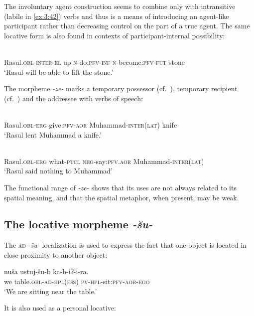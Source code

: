 ﻿\documentclass[output=paper]{langsci/langscibook}
\begin{document}
The involuntary agent construction seems to combine only with
intransitive (labile in \ref{ex:3:42}) verbs and thus is a means of introducing an
agent-like participant rather than decreasing control on the part of a
true agent. The same locative form is also found in contexts of
participant-internal possibility:

\ea
{}\\
Rasul.\textsc{obl}-\textsc{inter}-\textsc{el} up \textsc{n}-do:\textsc{pfv}-\textsc{inf} \textsc{n}-become:\textsc{pfv}-\textsc{fut} stone\\
\glt `Rasul will be able to lift the stone.'
\z

The morpheme \emph{-ze-} marks a temporary possessor (cf.\ ),
temporary recipient (cf.\ ) and the addressee with verbs of speech:

\ea
{}\\
Rasul.\textsc{obl}-\textsc{erg} give:\textsc{pfv}-\textsc{aor} Muhammad-\textsc{inter}(\textsc{lat}) knife\\
\glt `Rasul lent Muhammad a knife.'

\ex
{}\\
Rasul.\textsc{obl}-\textsc{erg} what-\textsc{ptcl} \textsc{neg}-say:\textsc{pfv}.\textsc{aor} Muhammad-\textsc{inter}(\textsc{lat})\\
\glt `Rasul said nothing to Muhammad'
\z

The functional range of \emph{-ze-} shows that its uses are not always
related to its spatial meaning, and that the spatial metaphor, when
present, may be weak.

\subsection{The locative morpheme \emph{-šu-}}
\label{the-locative-morpheme--ux161u-}

The \textsc{ad} \emph{-šu-} localization is used to express the fact
that one object is located in close proximity to another object:

\ea
\gll nuša ustuj-šu-b ka-b-iʔ-i-ra.\\
we table.\textsc{obl}-\textsc{ad}-\textsc{hpl}(\textsc{ess}) \textsc{pv}-\textsc{hpl}-sit:\textsc{pfv}-\textsc{aor}-\textsc{ego}\\
\glt `We are sitting near the table.'
\z

It is also used as a personal locative:
\end{document}
